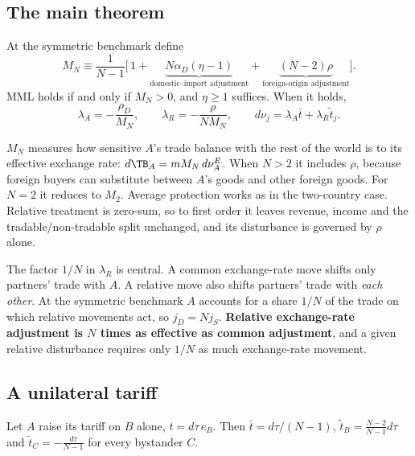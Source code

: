 \subsection{The main theorem}
\label{sec:theorem}

\begin{theorem}
\label{thm:main}
At the symmetric benchmark define
\begin{equation}
M_N\equiv\frac{1}{N-1}\Big[\,1+\underbrace{N\alpha_D(\eta-1)}_{\text{domestic--import adjustment}}+\underbrace{(N-2)\rho}_{\text{foreign-origin adjustment}}\Big].
\label{eq:MN}
\end{equation}
MML holds if and only if $M_N>0$, and $\eta\geq1$ suffices. When it holds,
\begin{equation}
\lambda_A=-\frac{\rho_D}{M_N},\qquad \lambda_R=-\frac{\rho}{NM_N},\qquad d\nu_j=\lambda_A\bar t+\lambda_R\tilde t_j.
\label{eq:lambdas}
\end{equation}
\end{theorem}

$M_N$ measures how sensitive $A$'s trade balance with the rest of the world is to its effective exchange rate: $d\TB_A=mM_N\,d\nu^E_A$. When $N>2$ it includes $\rho$, because foreign buyers can substitute between $A$'s goods and other foreign goods. For $N=2$ it reduces to $M_2$. Average protection works as in the two-country case. Relative treatment is zero-sum, so to first order it leaves revenue, income and the tradable/non-tradable split unchanged, and its disturbance is governed by $\rho$ alone.

The factor $1/N$ in $\lambda_R$ is central. A common exchange-rate move shifts only partners' trade with $A$. A relative move also shifts partners' trade with \emph{each other}. At the symmetric benchmark $A$ accounts for a share $1/N$ of the trade on which relative movements act, so $j_D=Nj_S$. \textbf{Relative exchange-rate adjustment is $N$ times as effective as common adjustment}, and a given relative disturbance requires only $1/N$ as much exchange-rate movement.

\subsection{A unilateral tariff}
\label{sec:unilateral}

Let $A$ raise its tariff on $B$ alone, $t=d\tau\,e_B$. Then $\bar t=d\tau/(N-1)$, $\tilde t_B=\frac{N-2}{N-1}d\tau$ and $\tilde t_C=-\frac{d\tau}{N-1}$ for every bystander $C$.

